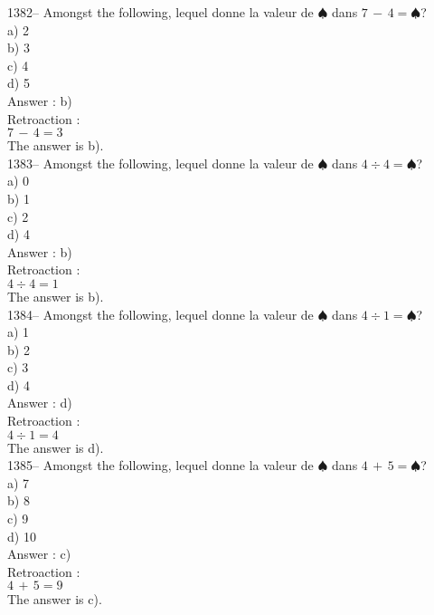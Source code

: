 ﻿\documentclass[letterpaper, 12pt]{article}
\begin{document}
1382-- Amongst the following, lequel donne la valeur de
$\spadesuit$ dans $7\,-\,4=\spadesuit$?\\
a) 2\\
b) 3\\
c) 4\\
d) 5\\

Answer : b)\\

Retroaction : \\
$7\,-\,4=3$\\
The answer is b).\\

1383-- Amongst the following, lequel donne la valeur de
$\spadesuit$ dans $4\div4=\spadesuit$?\\
a) 0\\
b) 1\\
c) 2\\
d) 4\\

Answer : b)\\

Retroaction : \\
$4\div4=1$\\
The answer is b).\\

1384-- Amongst the following, lequel donne la valeur de
$\spadesuit$ dans $4\div1=\spadesuit$?\\
a) 1\\
b) 2\\
c) 3\\
d) 4\\

Answer : d)\\

Retroaction : \\
$4\div1=4$\\
The answer is d).\\

1385-- Amongst the following, lequel donne la valeur de
$\spadesuit$ dans $4\,+\,5=\spadesuit$?\\
a) 7\\
b) 8\\
c) 9\\
d) 10\\

Answer : c)\\

Retroaction : \\
$4\,+\,5=9$\\
The answer is c).\\
\end{document}
